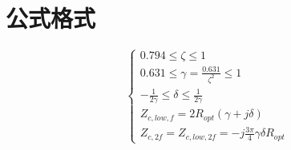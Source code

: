 

\section{公式格式}

\begin{equation}
\left\{ \begin{aligned}
0.794 \le \zeta  \le 1 ~~~~~~~~~~~\\
0.631 \le \gamma  = \frac{{0.631}}{{{\zeta ^2}}} \le 1~~~~~~ \\
- \frac{1}{{2\gamma }} \le \delta  \le \frac{1}{{2\gamma }}~~~~~~~~~~~ \\
{Z_{c,low,f}} = 2{R_{opt}}(\gamma  + j\delta )~~~~~\\
{Z_{c,2f}} = {Z_{c,low,2f}} =  - j\frac{{3\pi }}{4}\gamma \delta {R_{opt}}
\end{aligned} \right.
\label{eq:3.1}
\end{equation}

